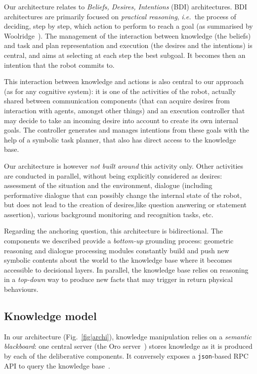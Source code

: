 \documentclass[letterpaper, 10 pt, conference]{ieeeconf}  %
\newcommand{\ie}{{\textit{i.e.\ }}}
\begin{document}
Our architecture relates to \emph{Beliefs, Desires, Intentions} (BDI)
architectures. BDI architectures are primarily focused on \emph{practical
reasoning}, \ie the process of deciding, step by step, which action to perform
to reach a goal (as summarised by Woolridge~\cite{Woolridge1999}). The
management of the interaction between knowledge (the beliefs) and task and plan
representation and execution (the desires and the intentions) is central, and
aims at selecting at each step the best subgoal. It becomes then an intention
that the robot commits to.

This interaction between knowledge and actions is also central to our approach
(as for any cognitive system): it is one of the activities of the
robot, actually shared between communication components (that can acquire
desires from interaction with agents, amongst other things) and an execution
controller that may decide to take an incoming desire into account to create
its own internal goals. The controller generates and manages intentions from
these goals with the help of a symbolic task planner, that also has direct
access to the knowledge base.

Our architecture is however \emph{not built around} this activity only. Other
activities are conducted in parallel, without being explicitly considered as
desires: assessment of the situation and the environment, dialogue (including
performative dialogue that can possibly change the internal state of the robot,
but does not lead to the creation of desires,like question answering or
statement assertion), various background monitoring and recognition tasks, etc.

Regarding the anchoring question, this architecture is bidirectional. The
components we described provide a \textit{bottom-up} grounding process:
geometric reasoning and dialogue processing modules constantly build and push
new symbolic contents about the world to the knowledge base where it becomes
accessible to decisional layers. In parallel, the knowledge base relies on
reasoning in a \textit{top-down} way to produce new facts that may trigger in
return physical behaviours.

\subsection*{Knowledge model}

In our architecture (Fig.~\ref{fig|archi}), knowledge manipulation relies on a
\emph{semantic blackboard}: one central server (the {\sc Oro}
server~\cite{Lemaignan2010}) stores knowledge as it is produced by each of the
deliberative components. It conversely exposes a {\tt json}-based RPC API to
query the knowledge base~\cite{lemaignan2012kbapi}.
\end{document}

